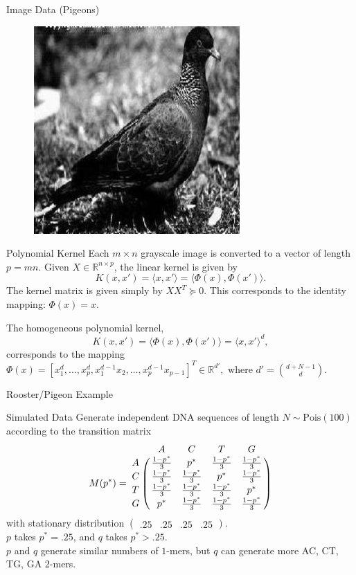 \documentclass{beamer}
\begin{document}
\begin{frame}{Image Data (Pigeons)}
\begin{figure}
    \includegraphics[scale=.35]{pigeonrs-image_0004.jpg}
  \end{figure}
\end{frame}

\begin{frame}{Polynomial Kernel}
  Each $m \times n$ grayscale image is converted to a vector of
  length $p=mn$.  \pause
  Given $X \in \mathbb{R}^{n \times p}$, the linear kernel is given by
  $$
  K(x, x') = \langle x, x'\rangle = \langle \Phi(x), \Phi(x')\rangle.
  $$
  The kernel matrix is given simply by $XX^T  \succeq 0$.  This
  corresponds to the identity mapping: $\Phi(x) = x$. \pause

  The homogeneous polynomial kernel,
  $$
  K(x, x') = \langle \Phi(x), \Phi(x')\rangle = \langle x, x' \rangle^d,
  $$
  corresponds to the mapping $\Phi(x) = [x_1^d, \ldots, x_p^d,
  x_1^{d-1}x_2, \ldots, x_p^{d-1}x_{p-1}]^T \in \mathbb{R}^{d'},
  \text{ where } d'=\binom{d+N-1}{d}$.
\end{frame}

\begin{frame}{Rooster/Pigeon Example}
  \begin{center}
    \resizebox{10.0cm}{!}{
      
    }
  \end{center}
\end{frame}

\begin{frame}{Simulated Data}
  Generate independent DNA sequences of length $N \sim \text{Pois}(100)$ according to the transition matrix
  \begin{equation*}
    M(p^*) = \bordermatrix{
      ~ & A & C & T & G \cr
      A & \frac{1-p^*}{3} & p^* & \frac{1-p^*}{3} & \frac{1-p^*}{3} \cr
      C & \frac{1-p^*}{3} & \frac{1-p^*}{3} & p^* & \frac{1-p^*}{3} \cr
      T & \frac{1-p^*}{3} & \frac{1-p^*}{3} & \frac{1-p^*}{3} & p^* \cr
      G & p^* & \frac{1-p^*}{3} & \frac{1-p^*}{3} & \frac{1-p^*}{3} \cr
    }
  \end{equation*}
  with stationary distribution $\begin{pmatrix}.25 & .25 & .25 & .25\end{pmatrix}$. \\ \pause
  $p$ takes $p^* = .25$, and $q$ takes $p^* > .25$. \\ \pause
  $p$ and $q$ generate similar numbers of $1$-mers, but $q$ can generate more AC, CT, TG, GA $2$-mers.
\end{frame}
\end{document}

